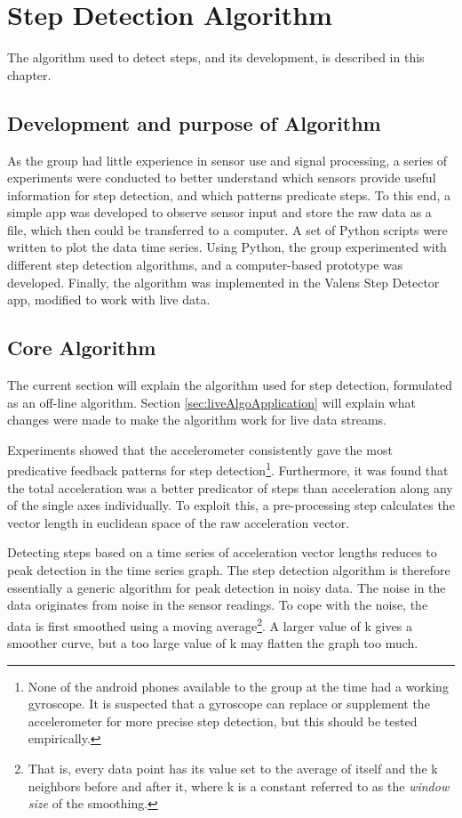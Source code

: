 \chapter{Step Detection Algorithm}
The algorithm used to detect steps, and its development, is described in this chapter. 

\section{Development and purpose of Algorithm}
As the group had little experience in sensor use and signal processing, a series of experiments were conducted to better understand which sensors provide useful information for step detection, and which patterns predicate steps. To this end, a simple app was developed to observe sensor input and store the raw data as a file, which then could be transferred to a computer. A set of Python scripts were written to plot  the data time series. Using Python, the group experimented with different step detection algorithms, and a computer-based prototype was developed. Finally, the algorithm was implemented in the Valens Step Detector app, modified to work with live data.

\section{Core Algorithm}\label{def:coreAlgorithm}
The current section will explain the algorithm used for step detection, formulated as an off-line algorithm. Section \ref{sec:liveAlgoApplication} will explain what changes were made to make the algorithm work for live data streams.

Experiments showed that the accelerometer consistently gave the most predicative feedback patterns for step detection\footnote{None of the android phones available to the group at the time had a working gyroscope. It is suspected that a gyroscope can replace or supplement the accelerometer for more precise step detection, but this should be tested empirically.}. Furthermore, it was found that the total acceleration was a better predicator of steps than acceleration along any of the single axes individually. To exploit this, a pre-processing step calculates the vector length in euclidean space of the raw acceleration vector.

Detecting steps based on a time series of acceleration vector lengths reduces to peak detection in the time series graph. The step detection algorithm is therefore essentially a generic algorithm for peak detection in noisy data. The noise in the data originates from noise in the sensor readings. To cope with the noise, the data is first smoothed using a moving average\footnote{That is, every data point has its value set to the average of itself and the k neighbors before and after it, where k is a constant referred to as the \emph{window size} of the smoothing.}. A larger value of k gives a smoother curve, but a too large value of k may flatten the graph too much.

